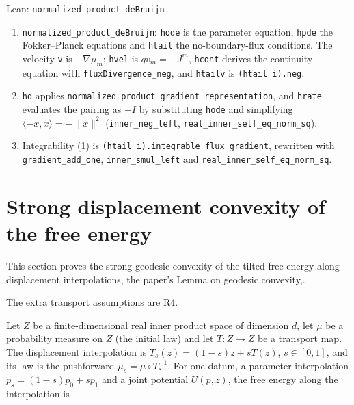 \documentclass[11pt,a4paper]{report}
\begin{document}
\begin{leanbox}{Lean: \texttt{normalized\_\allowbreak{}product\_\allowbreak{}deBruijn}}
\begin{enumerate}
\item \texttt{normalized\_\allowbreak{}product\_\allowbreak{}de\allowbreak{}Bruijn}: \texttt{hode} is the parameter equation, \texttt{hpde} the Fokker–Planck equations and \texttt{htail} the no-boundary-flux conditions. The velocity \texttt{v} is \(-\nabla\mu_m\); \texttt{hvel} is \(q v_m=-J^m\), \texttt{hcont} derives the continuity equation with \texttt{flux\allowbreak{}Divergence\_\allowbreak{}neg}, and \texttt{htailv} is \texttt{(htail i).\allowbreak{}neg}.

\item \texttt{hd} applies \texttt{normalized\_\allowbreak{}product\_\allowbreak{}gradient\_\allowbreak{}representation}, and \texttt{hrate} evaluates the pairing as \(-I\) by substituting \texttt{hode} and simplifying \(\langle-x,x\rangle=-\|x\|^2\) (\texttt{inner\_\allowbreak{}neg\_\allowbreak{}left}, \texttt{real\_\allowbreak{}inner\_\allowbreak{}self\_\allowbreak{}eq\_\allowbreak{}norm\_\allowbreak{}sq}).

\item Integrability (1) is \texttt{(htail i).\allowbreak{}integrable\_\allowbreak{}flux\_\allowbreak{}gradient}, rewritten with \texttt{gradient\_\allowbreak{}add\_\allowbreak{}one}, \texttt{inner\_\allowbreak{}smul\_\allowbreak{}left} and \texttt{real\_\allowbreak{}inner\_\allowbreak{}self\_\allowbreak{}eq\_\allowbreak{}norm\_\allowbreak{}sq}.

\end{enumerate}
\end{leanbox}
\section{\texorpdfstring{Strong displacement convexity of the free energy}{Strong displacement convexity of the free energy}}


This section proves the strong geodesic convexity of the tilted free energy along displacement interpolations, the paper's Lemma on geodesic convexity,.




The extra transport assumptions are R4.




Let \(Z\) be a finite-dimensional real inner product space of dimension \(d\), let \(\mu\) be a probability measure on \(Z\) (the initial law) and let \(T:Z\to Z\) be a transport map. The displacement interpolation is \(T_s(z)=(1-s)z+sT(z)\), \(s\in[0,1]\), and its law is the pushforward \(\mu_s=\mu\circ T_s^{-1}\). For one datum, a parameter interpolation \(p_s=(1-s)p_0+sp_1\) and a joint potential \(U(p,z)\), the free energy along the interpolation is
\end{document}

